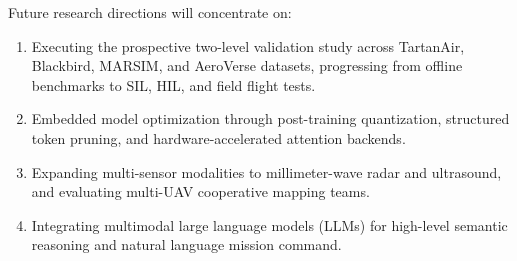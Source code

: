 Future research directions will concentrate on:
\begin{enumerate}
  \item Executing the prospective two-level validation study across TartanAir, Blackbird, MARSIM, and AeroVerse datasets, progressing from offline benchmarks to SIL, HIL, and field flight tests.
  \item Embedded model optimization through post-training quantization, structured token pruning, and hardware-accelerated attention backends.
  \item Expanding multi-sensor modalities to millimeter-wave radar and ultrasound, and evaluating multi-UAV cooperative mapping teams.
  \item Integrating multimodal large language models (LLMs) for high-level semantic reasoning and natural language mission command.
\end{enumerate}
